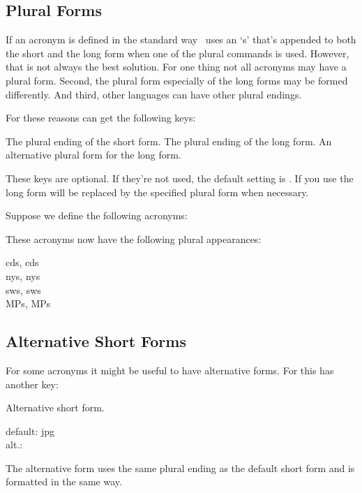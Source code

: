 \documentclass[load-preamble+]{cnltx-doc}
\begin{document}
\subsection{Plural Forms}
If an acronym is defined in the standard way \acro\ uses an `s' that's appended
to both the short and the long form when one of the plural commands is used.
However, that is not always the best solution.  For one thing not all acronyms
may have a plural form.  Second, the plural form especially of the long forms
may be formed differently.  And third, other languages can have other plural
endings.

For these reasons  can get the following keys:
\begin{options}
    The plural ending of the short form.
    The plural ending of the long form.
    An alternative plural form for the long form.
\end{options}
These keys are optional.  If they're not used, the default setting is
.  If you use  the long form will be replaced
by the specified plural form when necessary.

Suppose we define the following acronyms:
\begin{sourcecode}
\end{sourcecode}
These acronyms now have the following plural appearances:
\begin{example}
  \acsp{cd}, \aclp{cd} \\
  \acsp{ny}, \aclp{ny} \\
  \acsp{sw}, \aclp{sw} \\
  \acsp{MP}, \aclp{MP}
\end{example}

\subsection{Alternative Short Forms}
For some acronyms it might be useful to have alternative forms.  For this
 has another key:
\begin{options}
   Alternative short form.
\end{options}
\begin{example}
  default: \acs{jpg} \\
  alt.: 
\end{example}
The alternative form uses the same plural ending as the default short form and
is formatted in the same way.
\end{document}
